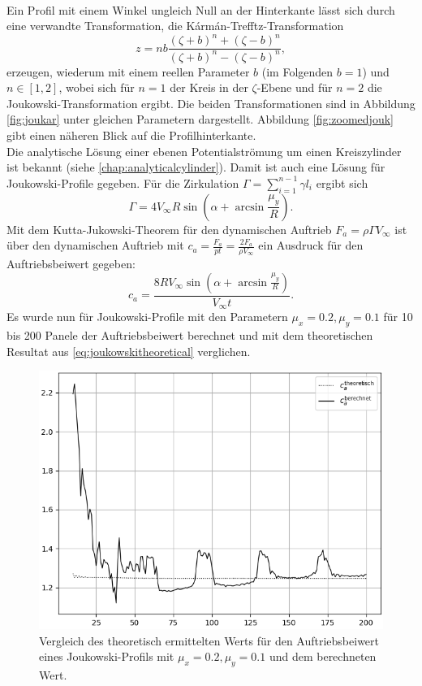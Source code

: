 \\
Ein Profil mit einem Winkel ungleich Null an der Hinterkante lässt sich durch eine verwandte Transformation, die Kármán-Trefftz-Transformation
\begin{equation}
z=nb{\frac {(\zeta +b)^{n}+(\zeta -b)^{n}}{(\zeta +b)^{n}-(\zeta -b)^{n}}},
\end{equation}
erzeugen, wiederum mit einem reellen Parameter $b$ (im Folgenden $b=1$) und $n \in [1,2]$, wobei sich für $n=1$ der Kreis in der $\zeta$-Ebene und für $n=2$ die Joukowski-Transformation ergibt. Die beiden Transformationen sind in Abbildung \ref{fig:joukar} unter gleichen Parametern dargestellt. Abbildung \ref{fig:zoomedjouk} gibt einen näheren Blick auf die Profilhinterkante. \\
Die analytische Lösung einer ebenen Potentialströmung um einen Kreiszylinder ist bekannt (siehe \ref{chap:analyticalcylinder}). Damit ist auch eine Lösung für Joukowski-Profile gegeben. Für die Zirkulation $\Gamma = \sum_{i=1}^{n-1} \gamma l_i$ ergibt sich
\begin{equation}
\Gamma = 4  V_{\infty}R \sin{\left(\alpha + \arcsin \frac{\mu_y}{R} \right)}.
\end{equation}
Mit dem Kutta-Jukowski-Theorem für den dynamischen Auftrieb $F_a = \rho \Gamma V_{\infty}$ ist über den dynamischen Auftrieb mit $c_a = \tfrac{F_a}{pt} = \tfrac{2F_a}{\rho V_{\infty}}$ ein Ausdruck für den Auftriebsbeiwert gegeben:
\begin{equation}
\label{eq:joukowskitheoretical}
c_a = \frac{8  R V_{\infty} \sin{\left(\alpha + \arcsin \frac{\mu_y}{R} \right)}}{V_{\infty}t}.
\end{equation} 
Es wurde nun für Joukowski-Profile mit den Parametern $\mu_x = 0.2, \mu_y =0.1$ für 10 bis 200 Panele der Auftriebsbeiwert berechnet und mit dem theoretischen Resultat aus \eqref{eq:joukowskitheoretical} verglichen. 
\begin{figure}[!ht]
\begin{center} \includegraphics[scale=0.5]{figures/joukowskierror.png} \end{center}
\caption{Vergleich des theoretisch ermittelten Werts für den Auftriebsbeiwert eines Joukowski-Profils mit $\mu_x = 0.2, \mu_y =0.1$ und dem berechneten Wert.}
\label{fig:joukowskitheoretical}
\end{figure}

